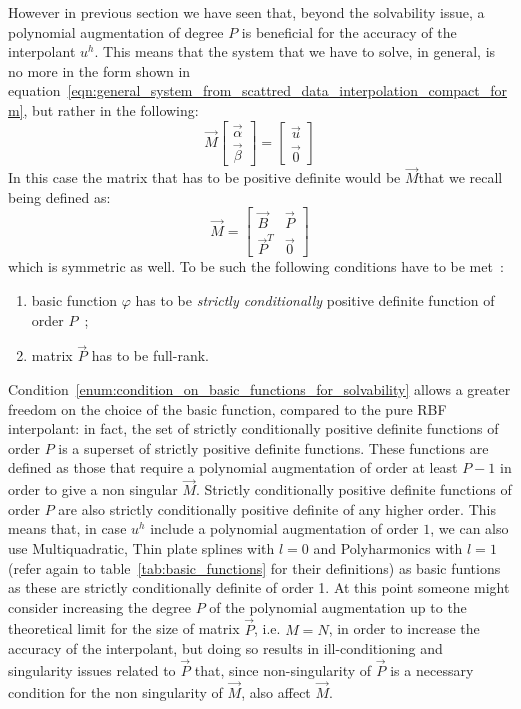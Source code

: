 However in previous section we have seen that, beyond the solvability issue, a polynomial augmentation of degree $P$ is beneficial for the accuracy of the interpolant $u^h$. This means that the system that we have to solve, in general, is no more in the form shown in equation~\eqref{eqn:general_system_from_scattred_data_interpolation_compact_form}, but rather in the following:
\begin{equation}
\label{eqn:general_system_from_scattred_data_interpolation_poly_augmentation_compact_form}
\vec{M}
\begin{bmatrix}
	\vec{\alpha}  \\  \vec{\beta}
\end{bmatrix} = 
\begin{bmatrix}
	\vec{u}  \\  \vec{0}
\end{bmatrix}
\end{equation}
In this case the matrix that has to be positive definite would be $\vec{M}$that we recall being defined as:
\begin{equation}
\label{eqn:global_M_definition}
\vec{M} =
\begin{bmatrix}
	\vec{B}    &  \vec{P}  \\
	\vec{P}^T  &  \vec{0}
\end{bmatrix}
\end{equation}
which is symmetric as well. 
To be such the following conditions have to be met~\cite{Miotti:phd_thesis}:
\begin{enumerate}
	\item basic function $\varphi$ has to be \emph{strictly conditionally} positive definite function of order $P$~\cite{Fasshauer:details_on_basic_functions};  \label{enum:condition_on_basic_functions_for_solvability}
	\item matrix $\vec{P}$ has to be full-rank.  \label{enum:condition_on_P_for_solvability}
\end{enumerate}
Condition~\ref{enum:condition_on_basic_functions_for_solvability} allows a greater freedom on the choice of the basic function, compared to the pure RBF interpolant: in fact, the set of strictly conditionally positive definite functions of order $P$ is a superset of strictly positive definite functions. These functions are defined as those that require a polynomial augmentation of order at least $P-1$ in order to give a non singular $\vec{M}$. Strictly conditionally positive definite functions of order $P$ are also strictly conditionally positive definite of any higher order. This means that, in case $u^h$ include a polynomial augmentation of order $1$, we can also use Multiquadratic, Thin plate splines with $l=0$ and Polyharmonics with $l=1$ (refer again to table~\ref{tab:basic_functions} for their definitions) as basic funtions as these are strictly conditionally definite of order 1. At this point someone might consider increasing the degree $P$ of the polynomial augmentation up to the theoretical limit for the size of matrix $\vec{P}$, i.e. $M=N$, in order to increase the accuracy of the interpolant, but doing so results in ill-conditioning and singularity issues related to $\vec{P}$ that, since non-singularity of $\vec{P}$ is a necessary condition for the non singularity of $\vec{M}$, also affect $\vec{M}$.


